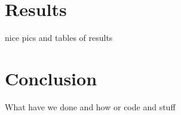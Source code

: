 \documentclass[10pt,twocolumn,letterpaper]{article}
\begin{document}
\section{Results}

nice pics and tables of results\cite{wu20153d}


\section{Conclusion}

What have we done and how
or code and stuff\cite{maturana2015voxnet}



{\small


}
\end{document}
